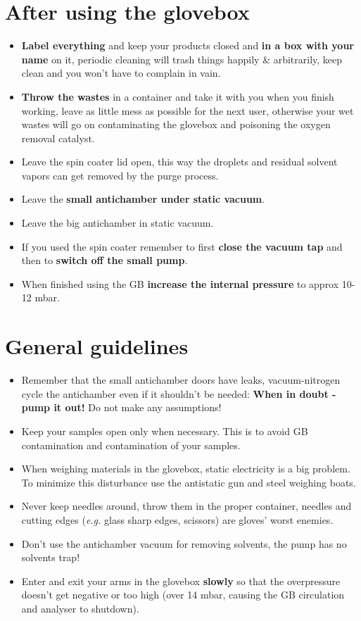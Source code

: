 \documentclass[a4paper,15pt]{scrartcl}
\begin{document}
\section*{After using the glovebox}
\begin{itemize}
	\item     \textbf{Label everything} and keep your products closed and \textbf{in a box with your name} on it, periodic cleaning will trash things happily \& arbitrarily, keep clean and you won't have to complain in vain.
	\item     \textbf{Throw the wastes} in a container and take it with you when you finish working, leave as little mess as possible for the next user, otherwise your wet wastes will go on contaminating the glovebox and poisoning the oxygen removal catalyst.
	\item     Leave the spin coater lid open, this way the droplets and residual solvent vapors can get removed by the purge process.
	\item     Leave the \textbf{small antichamber under static vacuum}.
	\item     Leave the big antichamber in static vacuum.
	\item     If you used the spin coater remember to first \textbf{close the vacuum tap} and then to \textbf{switch off the small pump}.
	\item    When finished using the GB \textbf{increase the internal pressure} to approx 10-12 mbar.
\end{itemize}


\section*{General guidelines}
\begin{itemize}
	\item     Remember that the small antichamber doors have leaks, vacuum-nitrogen cycle the antichamber even if it shouldn't be needed: \textbf{When in doubt - pump it out!} Do not make any assumptions!
	\item     Keep your samples open only when necessary. This is to avoid GB contamination and contamination of your samples.
	\item     When weighing materials in the glovebox, static electricity is a big problem. To minimize this disturbance use the antistatic gun and steel weighing boats.
	\item     Never keep needles around, throw them in the proper container, needles and cutting edges (\textit{e.g.} glass sharp edges, scissors) are gloves' worst enemies.
	\item     Don't use the antichamber vacuum for removing solvents, the pump has no solvents trap!
	\item     Enter and exit your arms in the glovebox \textbf{slowly} so that the overpressure doesn't get negative or too high (over 14 mbar, causing the GB circulation and analyser to shutdown).
\end{itemize}
\end{document}
